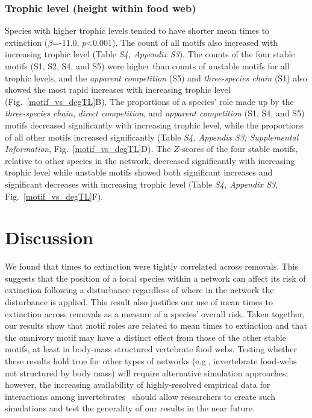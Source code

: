 \documentclass[12pt]{article}
\begin{document}
\begin{spacing}{2.0}
        \subsubsection*{Trophic level (height within food web)}
            
            Species with higher trophic levels tended to have shorter mean times to extinction ($\beta$=-11.0, $p$\textless0.001).
            The count of all motifs also increased with increasing trophic level (Table \emph{S4, Appendix S3}). 
            The counts of the four stable motifs (S1, S2, S4, and S5) were higher than counts of unstable motifs for all trophic levels, and the \emph{apparent competition} (S5) and \emph{three-species chain} (S1) also showed the most rapid increases with increasing trophic level (Fig.~\ref{motif_vs_degTL}B).
            The proportions of a species' role made up by the \emph{three-species chain}, \emph{direct competition}, and \emph{apparent competition} (S1, S4, and S5) motifs decreased significantly with increasing trophic level, while the proportions of all other motifs increased significantly (Table \emph{S4, Appendix S3; Supplemental Information}, Fig.~\ref{motif_vs_degTL}D).
            The $Z$-scores of the four stable motifs, relative to other species in the network, decreased significantly with increasing trophic level while unstable motifs showed both significant increases and significant decreases with increasing trophic level (Table \emph{S4, Appendix S3}, Fig.~\ref{motif_vs_degTL}F).


\section*{Discussion}

    We found that times to extinction were tightly correlated across removals. 
    This suggests that the position of a focal species within a network can affect its risk of extinction following a disturbance regardless of where in the network the disturbance is applied. This result also justifies our use of mean times to extinction across removals as a measure of a species' overall risk.
    Taken together, our results show that motif roles are related to mean times to extinction and that the omnivory motif may have a distinct effect from those of the other stable motifs, at least in body-mass structured vertebrate food webs.
    Testing whether these results hold true for other types of networks (e.g., invertebrate food-webs not structured by body mass) will require alternative simulation approaches; however, the increasing availability of highly-resolved empirical data for interactions among invertebrates~\citep{} should allow researchers to create such simulations and test the generality of our results in the near future.



\end{spacing}
\end{document}
